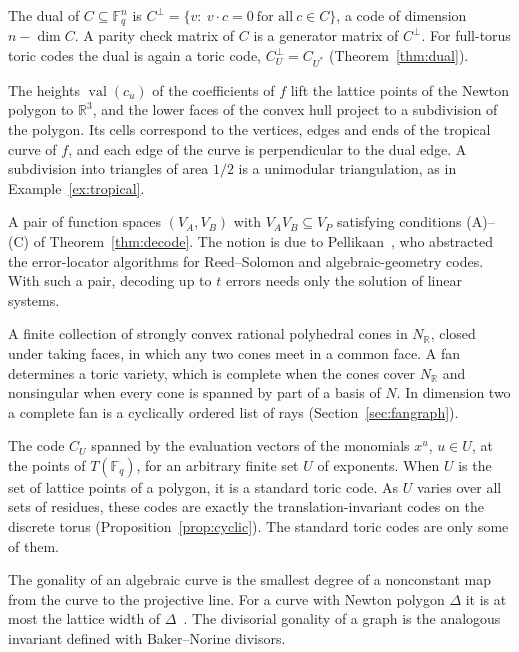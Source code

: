 \documentclass[12pt,letterpaper]{article}
\numberwithin{equation}{section}
\theoremstyle{definition}
\theoremstyle{remark}
\newcommand{\R}{\mathbb{R}}
\newcommand{\Fq}{\mathbb{F}_q}
\begin{document}
\begin{description}[leftmargin=1.5em,labelindent=0pt,style=nextline]
\item[Dual code] The dual of $C\subseteq\Fq^n$ is
$C^\perp=\{v:\ v\cdot c=0\ \text{for all}\ c\in C\}$, a code of dimension
$n-\dim C$. A parity check matrix of $C$ is a generator matrix of $C^\perp$.
For full-torus toric codes the dual is again a toric code,
$C_U^\perp=C_{U^*}$ (Theorem~\ref{thm:dual}).
\item[Dual subdivision] The heights $\operatorname{val}(c_u)$ of the
coefficients of $f$ lift the lattice points of the Newton polygon to $\R^3$,
and the lower faces of the convex hull project to a subdivision of the
polygon. Its cells correspond to the vertices, edges and ends of the tropical
curve of $f$, and each edge of the curve is perpendicular to the dual edge. A
subdivision into triangles of area $1/2$ is a unimodular triangulation, as in
Example~\ref{ex:tropical}.
\item[Error-correcting pair] A pair of function spaces $(V_A,V_B)$ with
$V_AV_B\subseteq V_P$ satisfying conditions (A)--(C) of
Theorem~\ref{thm:decode}. The notion is due to Pellikaan~\cite{Pe92}, who
abstracted the error-locator algorithms for Reed--Solomon and
algebraic-geometry codes. With such a pair, decoding up to $t$ errors needs
only the solution of linear systems.
\item[Fan] A finite collection of strongly convex rational polyhedral cones in
$N_\R$, closed under taking faces, in which any two cones meet in a common
face. A fan determines a toric variety, which is complete when the cones cover
$N_\R$ and nonsingular when every cone is spanned by part of a basis of $N$.
In dimension two a complete fan is a cyclically ordered list of rays
(Section~\ref{sec:fangraph}).
\item[Generalized toric code] The code $C_U$ spanned by the evaluation vectors
of the monomials $x^u$, $u\in U$, at the points of $T(\Fq)$, for an arbitrary
finite set $U$ of exponents. When $U$ is the set of lattice points of a
polygon, it is a standard toric code. As $U$ varies over all sets of
residues, these codes are exactly the translation-invariant codes on the
discrete torus (Proposition~\ref{prop:cyclic}). The standard toric codes are
only some of them.
\item[Gonality] The gonality of an algebraic curve is the smallest degree of a
nonconstant map from the curve to the projective line. For a curve with
Newton polygon $\Delta$ it is at most the lattice width of $\Delta$~\cite{CC12}.
The divisorial gonality of a graph is the analogous invariant defined with
Baker--Norine divisors.

\end{description}
\end{document}
